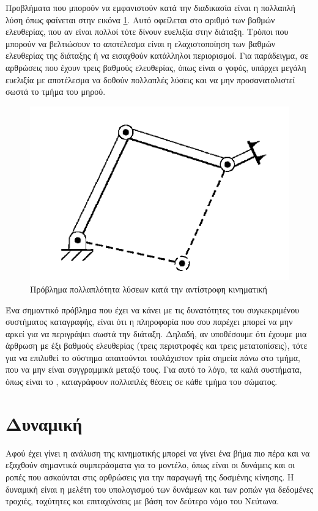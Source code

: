 Προβλήματα που μπορούν να εμφανιστούν κατά την διαδικασία είναι η πολλαπλή λύση όπως φαίνεται στην εικόνα \ref{fig:ik-multiple-solutions}. Αυτό οφείλεται στο αριθμό των βαθμών ελευθερίας, που αν είναι πολλοί τότε δίνουν ευελιξία στην διάταξη. Τρόποι που μπορούν να βελτιώσουν το αποτέλεσμα είναι η ελαχιστοποίηση των βαθμών ελευθερίας της διάταξης ή να εισαχθούν κατάλληλοι περιορισμοί. Για παράδειγμα, σε αρθρώσεις που έχουν τρεις βαθμούς ελευθερίας, όπως είναι ο γοφός, υπάρχει μεγάλη ευελιξία με αποτέλεσμα να δοθούν πολλαπλές λύσεις και να μην προσανατολιστεί σωστά το τμήμα του μηρού.

\begin{figure}[H]
    \centering
    \includegraphics[width=.7\textwidth, height=.29\textheight]{rigidbody/fig/ik-multiple-solutions.png}
    \caption{Πρόβλημα πολλαπλότητα λύσεων κατά την αντίστροφη κινηματική\cite{craig95}}
    \label{fig:ik-multiple-solutions}
\end{figure}

Ένα σημαντικό πρόβλημα που έχει να κάνει με τις δυνατότητες του συγκεκριμένου συστήματος καταγραφής, είναι ότι η πληροφορία που σου παρέχει μπορεί να μην αρκεί για να περιγράψει σωστά την διάταξη. Δηλαδή, αν υποθέσουμε ότι έχουμε μια άρθρωση με έξι βαθμούς ελευθερίας (τρεις περιστροφές και τρεις μετατοπίσεις), τότε για να επιλυθεί το σύστημα απαιτούνται τουλάχιστον τρία σημεία πάνω στο τμήμα, που να μην είναι συγγραμμικά μεταξύ τους. Για αυτό το λόγο, τα καλά συστήματα, όπως είναι το , καταγράφουν πολλαπλές θέσεις σε κάθε τμήμα του σώματος.

\section{Δυναμική}

Αφού έχει γίνει η ανάλυση της κινηματικής μπορεί να γίνει ένα βήμα πιο πέρα και να εξαχθούν σημαντικά συμπεράσματα για το μοντέλο, όπως είναι οι δυνάμεις και οι ροπές που ασκούνται στις αρθρώσεις για την παραγωγή της δοσμένης κίνησης. Η δυναμική είναι η μελέτη του υπολογισμού των δυνάμεων και των ροπών για δεδομένες τροχιές, ταχύτητες και επιταχύνσεις με βάση τον δεύτερο νόμο του Νεύτωνα.

